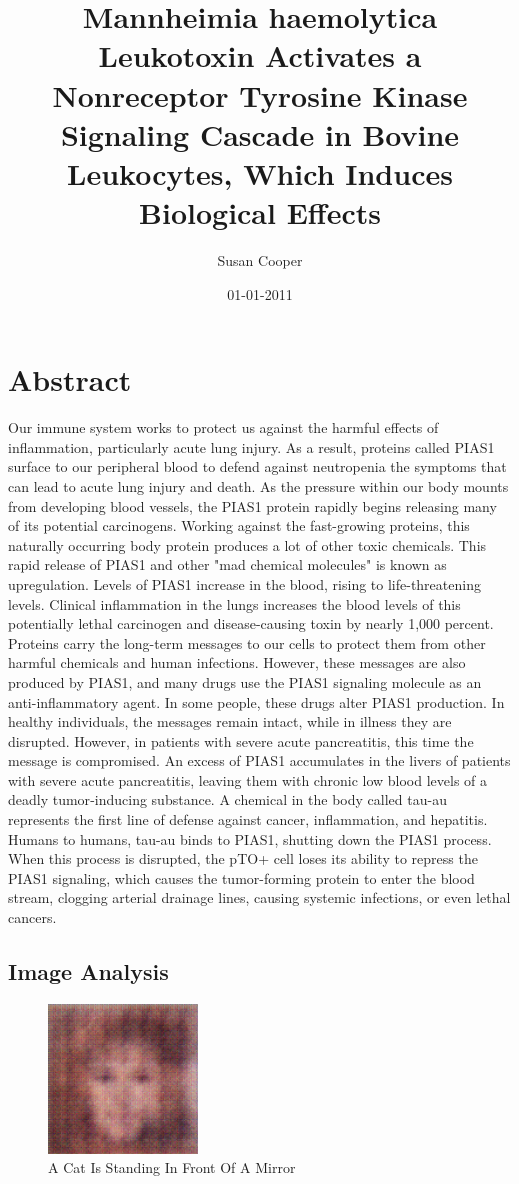 \documentclass{article}%
\title{Mannheimia haemolytica Leukotoxin Activates a Nonreceptor Tyrosine Kinase Signaling Cascade in Bovine Leukocytes, Which Induces Biological Effects}%
\author{Susan Cooper}%
\affil{State Key Laboratory of Cancer Biology and Xijing Hospital of Digestive Diseases, The Fourth Military Medical University, Xian, Shaanxi, People's Republic of China}%
\date{01{-}01{-}2011}%
\begin{document}
%
\normalsize%
\maketitle%
\section{Abstract}%
\label{sec:Abstract}%
Our immune system works to protect us against the harmful effects of inflammation, particularly acute lung injury. As a result, proteins called PIAS1 surface to our peripheral blood to defend against neutropenia the symptoms that can lead to acute lung injury and death.\newline%
As the pressure within our body mounts from developing blood vessels, the PIAS1 protein rapidly begins releasing many of its potential carcinogens. Working against the fast{-}growing proteins, this naturally occurring body protein produces a lot of other toxic chemicals. This rapid release of PIAS1 and other "mad chemical molecules" is known as upregulation.\newline%
Levels of PIAS1 increase in the blood, rising to life{-}threatening levels. Clinical inflammation in the lungs increases the blood levels of this potentially lethal carcinogen and disease{-}causing toxin by nearly 1,000 percent.\newline%
Proteins carry the long{-}term messages to our cells to protect them from other harmful chemicals and human infections. However, these messages are also produced by PIAS1, and many drugs use the PIAS1 signaling molecule as an anti{-}inflammatory agent. In some people, these drugs alter PIAS1 production. In healthy individuals, the messages remain intact, while in illness they are disrupted.\newline%
However, in patients with severe acute pancreatitis, this time the message is compromised. An excess of PIAS1 accumulates in the livers of patients with severe acute pancreatitis, leaving them with chronic low blood levels of a deadly tumor{-}inducing substance.\newline%
A chemical in the body called tau{-}au represents the first line of defense against cancer, inflammation, and hepatitis. Humans to humans, tau{-}au binds to PIAS1, shutting down the PIAS1 process. When this process is disrupted, the pTO+ cell loses its ability to repress the PIAS1 signaling, which causes the tumor{-}forming protein to enter the blood stream, clogging arterial drainage lines, causing systemic infections, or even lethal cancers.

%
\subsection{Image Analysis}%
\label{subsec:ImageAnalysis}%


\begin{figure}[h!]%
\centering%
\includegraphics[width=150px]{500_fake_images/samples_5_443.png}%
\caption{A Cat Is Standing In Front Of A Mirror}%
\end{figure}

%
\end{document}
